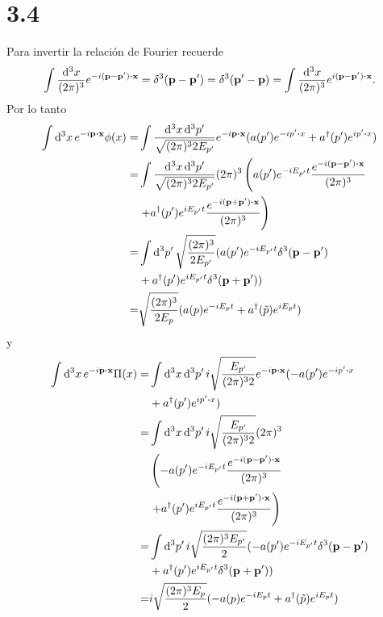 \documentclass{article}
\begin{document}
\section*{3.4}

Para invertir la relación de Fourier recuerde
\begin{equation}\label{ec:dirac}
\int\frac{\dd[3]{x}}{(2\pi)^3}e^{-i(\vb{p}-\vb{p'})\vdot \vb{x}}=\delta^3(\vb{p}-\vb{p'})=\delta^3(\vb{p'}-\vb{p})=\int\frac{\dd[3]{x}}{(2\pi)^3}e^{i(\vb{p}-\vb{p'})\vdot \vb{x}}.
\end{equation}
Por lo tanto
\begin{align}
\begin{split}
\int \dd[3]{x} e^{-i\vb{p}\vdot\vb{x}}\phi(x)=&\int\frac{\dd[3]{x}\dd[3]{p'}}{\sqrt{(2\pi)^32E_{p'}}}e^{-i\vb{p}\vdot\vb{x}}(a(p')e^{-i{p'}\vdot x}+a^\dagger(p')e^{ip'\vdot x})\\
=&\int\frac{\dd[3]{x}\dd[3]{p'}}{\sqrt{(2\pi)^32E_{p'}}}(2\pi)^3\left(a(p')e^{-iE_{p'}t}\frac{e^{-i(\vb{p}-\vb{p'})\vdot\vb{x}}}{(2\pi)^3}\right.\\
&\left.+a^\dagger(p')e^{iE_{p'}t}\frac{e^{-i(\vb{p}+\vb{p'})\vdot\vb{x}}}{(2\pi)^3}\right)\\
=&\int\dd[3]{p'}\sqrt{\frac{(2\pi)^3}{2E_{p'}}}(a(p')e^{-iE_{p'}t}\delta^3(\vb{p}-\vb{p'})\\
&+a^\dagger(p')e^{iE_{p'}t}\delta^3(\vb{p}+\vb{p'}))\\
=&\sqrt{\frac{(2\pi)^3}{2E_{p}}}(a(p)e^{-iE_{p}t}+a^\dagger(\tilde{p})e^{iE_{p}t})
\end{split}
\end{align}
y 
\begin{align}
\begin{split}
\int \dd[3]{x} e^{-i\vb{p}\vdot\vb{x}}\Pi(x)=&\int\dd[3]{x}\dd[3]{p'}i\sqrt{\frac{E_{p'}}{(2\pi)^32}}e^{-i\vb{p}\vdot\vb{x}}(-a(p')e^{-i{p'}\vdot x}\\
&+a^\dagger(p')e^{ip'\vdot x})\\
=&\int\dd[3]{x}\dd[3]{p'}i\sqrt{\frac{E_{p'}}{(2\pi)^32}}(2\pi)^3\\
&\left(-a(p')e^{-iE_{p'}t}\frac{e^{-i(\vb{p}-\vb{p'})\vdot\vb{x}}}{(2\pi)^3}\right.\\
&\left.+a^\dagger(p')e^{iE_{p'}t}\frac{e^{-i(\vb{p}+\vb{p'})\vdot\vb{x}}}{(2\pi)^3}\right)\\
=&\int\dd[3]{p'}i\sqrt{\frac{(2\pi)^3E_{p'}}{2}}(-a(p')e^{-iE_{p'}t}\delta^3(\vb{p}-\vb{p'})\\
&+a^\dagger(p')e^{iE_{p'}t}\delta^3(\vb{p}+\vb{p'}))\\
=&i\sqrt{\frac{(2\pi)^3E_{p}}{2}}(-a(p)e^{-iE_{p}t}+a^\dagger(\tilde{p})e^{iE_{p}t})
\end{split}
\end{align}
\end{document}
